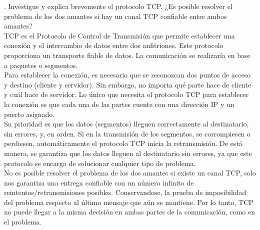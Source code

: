 . Investigue y explica brevemente el protocolo TCP.
¿Es posible resolver el problema de los dos amantes
si hay un canal TCP confiable entre ambos amantes?\\

TCP es el Protocolo de Control de Transmisión que permite establecer una
conexión y el intercambio de datos entre dos anfitriones. Este protocolo
proporciona un transporte fiable de datos. La comunicación se realizaría en
base a paquetes o segmentos.\\

Para establecer la conexión, es necesario que se reconozcan dos puntos de
acceso y destino (cliente y servidor). Sin embargo, no importa qué parte
hace de cliente y cuál hace de servidor. Lo único que necesita el protocolo
TCP para establecer la conexión es que cada una de las partes cuente con una
dirección IP y un puerto asignado.\\

Su prioridad es que los datos (segmentos) lleguen correctamente al destinatario,
sin errores, y, en orden. Si en la transmisión de los segmentos, se corrompiesen
o perdiesen, automáticamente el protocolo TCP inicia la retransmisión. De está
manera, se garantiza que los datos lleguen al destinatario sin errores,
ya que este protocolo se encarga de solucionar cualquier tipo de problema.\\

No es posible resolver el problema de los dos amantes si existe un canal TCP,
solo nos garantiza una entrega confiable con un número infinito de
reintentos/retransmisiones posibles. Conservandose, la prueba de imposibilidad
del problema respecto al último mensaje que aún se mantiene. Por lo tanto,
TCP no puede llegar a la misma decisión en ambas partes de la comunicación,
como en el problema.

